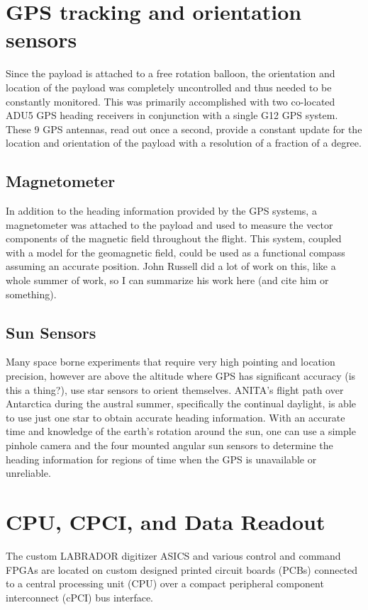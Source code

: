\section{GPS tracking and orientation sensors}
	Since the payload is attached to a free rotation balloon, the orientation and location of the payload was completely uncontrolled and thus needed to be constantly monitored.  This was primarily accomplished with two co-located ADU5 GPS heading receivers in conjunction with a single G12 GPS system.  These 9 GPS antennas, read out once a second, provide a constant update for the location and orientation of the payload with a resolution of a fraction of a degree.
	\subsection{Magnetometer}
		In addition to the heading information provided by the GPS systems, a magnetometer was attached to the payload and used to measure the vector components of the magnetic field throughout the flight.  This system, coupled with a model for the geomagnetic field, could be used as a functional compass assuming an accurate position.  John Russell did a lot of work on this, like a whole summer of work, so I can summarize his work here (and cite him or something).
	\subsection{Sun Sensors}
		Many space borne experiments that require very high pointing and location precision, however are above the altitude where GPS has significant accuracy (is this a thing?), use star sensors to orient themselves.  ANITA's flight path over Antarctica during the austral summer, specifically the continual daylight, is able to use just one star to obtain accurate heading information.  With an accurate time and knowledge of the earth's rotation around the sun, one can use a simple pinhole camera and the four mounted angular sun sensors to determine the heading information for regions of time when the GPS is unavailable or unreliable.
		
\section{CPU, CPCI, and Data Readout}
	The custom LABRADOR digitizer ASICS and various control and command FPGAs are located on custom designed printed circuit boards (PCBs) connected to a central processing unit (CPU) over a compact peripheral component interconnect (cPCI) bus interface.  
	
